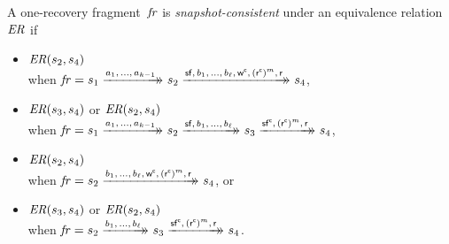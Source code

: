 \begin{definition}
A one-recovery fragment~$\mathit{fr}$ is \emph{snapshot-consistent} under an equivalence relation~$\mathit{ER}$ if
\begin{itemize}
\item $\mathit{ER}(s_2, s_4)$ \\
when $\mathit{fr} = s_1 \xrightarrow{a_1,\, \ldots,\, a_{k-1}}\mathrel{\mkern-14mu}\rightarrow_{} s_2 \xrightarrow{\mathsf{sf},\, b_1,\, \ldots,\, b_\ell,\, \mathsf w^\mathsf{c},\, (\mathsf{r^c})^m,\, \mathsf r}\mathrel{\mkern-14mu}\rightarrow_{} s_4$,
\item $\mathit{ER}(s_3, s_4)$ or $\mathit{ER}(s_2, s_4)$ \\
when $\id{fr} = s_1 \ttsIn{a_1,\, \ldots,\, a_{k-1}}{} s_2 \ttsIn{\actf,\, b_1,\, \ldots,\, b_\ell}{} s_3 \ttsIn{\actfc,\, (\actrc)^m,\, \actr}{} s_4$,
\item $\mathit{ER}(s_2, s_4)$ \\
when $\mathit{fr} = s_2 \xrightarrow{b_1,\, \ldots,\, b_\ell,\, \mathsf w^\mathsf{c},\, (\mathsf{r^c})^m,\, \mathsf r}\mathrel{\mkern-14mu}\rightarrow_{} s_4$, or
\item $\mathit{ER}(s_3, s_4)$ or $\mathit{ER}(s_2, s_4)$ \\
when $\mathit{fr} = s_2 \xrightarrow{b_1,\, \ldots,\, b_\ell}\mathrel{\mkern-14mu}\rightarrow_{} s_3 \xrightarrow{\mathsf{sf^c},\, (\mathsf{r^c})^m,\, \mathsf r}\mathrel{\mkern-14mu}\rightarrow_{} s_4$.
\end{itemize}
\end{definition}


